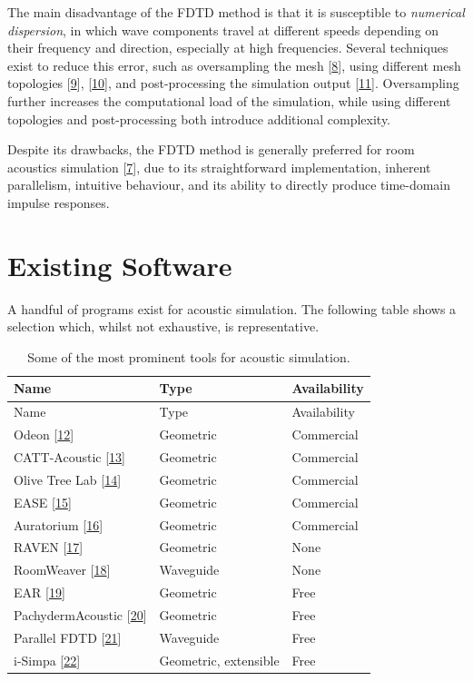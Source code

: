 \documentclass[]{scrreprt}
\begin{document}
The main disadvantage of the FDTD method is that it is susceptible to
\emph{numerical dispersion}, in which wave components travel at
different speeds depending on their frequency and direction, especially
at high frequencies. Several techniques exist to reduce this error, such
as oversampling the mesh
{[}\protect\hyperlink{ref-camposux5fcomputationalux5f2005}{8}{]}, using
different mesh topologies
{[}\protect\hyperlink{ref-saviojaux5freductionux5f1999}{9}{]},
{[}\protect\hyperlink{ref-vanux5fduyneux5ftetrahedralux5f1995}{10}{]},
and post-processing the simulation output
{[}\protect\hyperlink{ref-saviojaux5finterpolatedux5f2001}{11}{]}.
Oversampling further increases the computational load of the simulation,
while using different topologies and post-processing both introduce
additional complexity.

Despite its drawbacks, the FDTD method is generally preferred for room
acoustics simulation
{[}\protect\hyperlink{ref-valimakiux5ffiftyux5f2012}{7}{]}, due to its
straightforward implementation, inherent parallelism, intuitive
behaviour, and its ability to directly produce time-domain impulse
responses.

\section{Existing Software}\label{existing-software}

A handful of programs exist for acoustic simulation. The following table
\text{(\ref{tab:software})} shows a selection which, whilst not
exhaustive, is representative.

\begin{longtable}[c]{@{}lll@{}}
\caption{Some of the most prominent tools for acoustic
simulation.\label{tab:software}}\tabularnewline
\toprule
Name & Type & Availability\tabularnewline
\midrule
\endfirsthead
\toprule
Name & Type & Availability\tabularnewline
\midrule
\endhead
Odeon {[}\protect\hyperlink{ref-ux5fodeonux5f2016}{12}{]} & Geometric &
Commercial\tabularnewline
CATT-Acoustic
{[}\protect\hyperlink{ref-ux5fcatt-acousticux5f2016}{13}{]} & Geometric
& Commercial\tabularnewline
Olive Tree Lab {[}\protect\hyperlink{ref-ux5fotlux5f2016}{14}{]} &
Geometric & Commercial\tabularnewline
EASE {[}\protect\hyperlink{ref-ux5feaseux5f2016}{15}{]} & Geometric &
Commercial\tabularnewline
Auratorium {[}\protect\hyperlink{ref-ux5faudiobornux5f2016}{16}{]} &
Geometric & Commercial\tabularnewline
RAVEN {[}\protect\hyperlink{ref-schroderux5fraven:ux5f2011}{17}{]} &
Geometric & None\tabularnewline
RoomWeaver
{[}\protect\hyperlink{ref-beesonux5froomweaver:ux5f2004}{18}{]} &
Waveguide & None\tabularnewline
EAR {[}\protect\hyperlink{ref-ux5fearux5f2016}{19}{]} & Geometric &
Free\tabularnewline
PachydermAcoustic
{[}\protect\hyperlink{ref-ux5fpachydermux5f2016}{20}{]} & Geometric &
Free\tabularnewline
Parallel FDTD {[}\protect\hyperlink{ref-ux5fparallelfdtdux5f2016}{21}{]}
& Waveguide & Free\tabularnewline
i-Simpa {[}\protect\hyperlink{ref-ux5fi-simpaux5f2016}{22}{]} &
Geometric, extensible & Free\tabularnewline
\bottomrule
\end{longtable}
\end{document}
